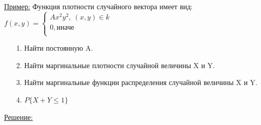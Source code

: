 \underline{Пример:} Функция плотности случайного вектора имеет вид:\\
$f(x,y) = 
\begin{cases}
	A x^2 y^2, \ (x,y) \in k\\
	0, \text{иначе}\\
\end{cases}$\\
\begin{enumerate}
	\item[1.] Найти постоянную A.
	\item[2.] Найти маргинальные плотности случайной величины X и Y.
	\item[3.] Найти маргинальные функции распределения случайной величины X и Y.
	\item[4.] $P\{X + Y \leqslant 1\}$
\end{enumerate}
\underline{Решение:} 
